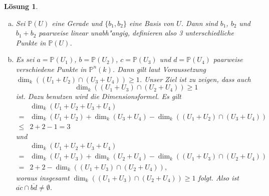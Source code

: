 \documentclass[a4paper, 12pt, numbers=noendperiod, chapterprefix=true, headsepline]{scrbook}
\theoremstyle{break}
\newtheorem{Loes}{L\"osung}
\theoremstyle{nonumberbreak}
\theoremstyle{nonumberplain}
\newcommand{\IP}{\mathbb{P}}%
\begin{document}
\begin{Loes}
\begin{enumerate}[a)]
	Aus $a \neq b$ und $\dim_k(a) = \dim_k(b) = 1$ folgt, dass $a \cap b = \{0\}$. Mit der Dimensionsformel folgt dann $\dim_k(a+b) = 1+1-0 = 2$. $\IP(a+b)$ ist also eine Gerade, die $a$ und $b$ enth"alt. Die Gerade ist eindeutig, da $a+b$ der kleinste Untervektorraum von $k^{n+1}$ ist, der sowohl $a$ als auch $b$ enth"alt und da $a+b$ schon Dimension $2$ hat.
\item
	Sei $\IP(U)$ eine Gerade und $\{b_1,b_2\}$ eine Basis von $U$. Dann sind $b_1$, $b_2$ und $b_1+b_2$ paarweise linear unabh"angig, definieren also 3 unterschiedliche Punkte in $\IP(U)$.
\item
	Es sei $a=\IP(U_1)$, $b=\IP(U_2)$, $c=\IP(U_3)$ und $d=\IP(U_4)$ paarweise verschiedene Punkte in $\IP^n(k)$. Dann gilt laut Voraussetzung $\dim_k((U_1+U_2) \cap (U_3+U_4)) \geq 1$. Unser Ziel ist zu zeigen, dass auch 
		\[\dim_k((U_1+U_3) \cap (U_2+U_4)) \geq 1\]
	ist. Dazu benutzen wird die Dimensionsformel. Es gilt
		\[\begin{array}{cl}
			&\dim_k(U_1+U_2+U_3+U_4)\\
			=& \dim_k(U_1+U_2)+\dim_k(U_3+U_4)-\dim_k((U_1+U_2) \cap (U_3+U_4))\\
			\leq & 2 + 2 - 1 = 3
		\end{array}\]
	und
		\[\begin{array}{cl}
			&\dim_k(U_1+U_2+U_3+U_4) \\
			=& \dim_k(U_1+U_3)+\dim_k(U_2+U_4)-\dim_k((U_1+U_3) \cap (U_2+U_4))\\
			=& 2 + 2 - \dim_k((U_1+U_3) \cap (U_2+U_4)),
		\end{array}\]
	woraus insgesamt $\dim_k((U_1+U_3) \cap (U_2+U_4)) \geq 1$ folgt. Also ist $\overline{ac}\cap \overline{bd} \neq \emptyset$.
\end{enumerate}\end{Loes}

\setcounter{Loes}{2}
\end{document}
